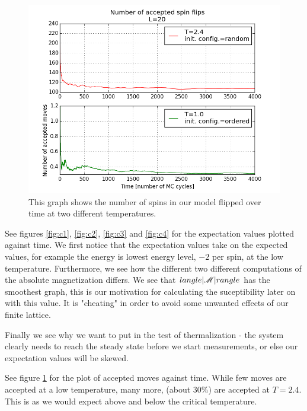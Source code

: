 \documentclass[norsk, 10pt, twocolumn, a4paper]{revtex4}
\begin{document}
\begin{figure}
    \includegraphics[width=0.9\linewidth]{c_accepted.png}
    \caption{
        \label{fig:c5}
        This graph shows the number of spins in our model flipped over time at two different
    temperatures.}
\end{figure}

See figures \ref{fig:c1}, \ref{fig:c2}, \ref{fig:c3} and \ref{fig:c4} for the expectation values plotted against time.
We first notice that the expectation values take on the expected values, for example the energy
is lowest energy level, $-2$ per spin, at the low temperature. Furthermore, we see how the
different two different computations of the absolute magnetization differs.
We see that  $\\langle |\mathscr{M}| \\rangle$ has the smoothest graph, this is our motivation
for calculating the suceptibility later on with this value. It is "cheating" in order
to avoid some unwanted effects of our finite lattice.

Finally we see why we want to put in the test of thermalization - the system clearly needs
to reach the steady state before we start measurements, or else our expectation values will
be skewed.

See figure \ref{fig:c5} for the plot of accepted moves against time. While few moves are
accepted at a low temperature, many more, (about $30\%$) are accepted at $T=2.4$.
This is as we would expect above and below the critical temperature.
\end{document}
